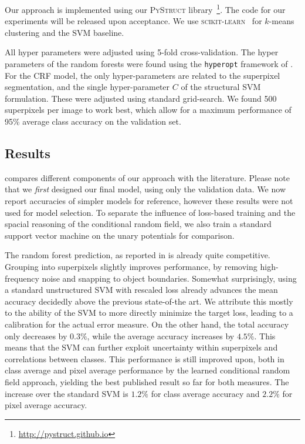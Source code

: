 \documentclass[a4paper, 10pt, conference]{ieeeconf}      %
\begin{document}
Our approach is implemented using our \textsc{PyStruct}
library~\footnote{\url{http://pystruct.github.io}}.  The code for our
experiments will be released upon acceptance. We use \textsc{scikit-learn}~\citep{pedregosa2011scikit}
for $k$-means clustering and the SVM baseline.

All hyper parameters were adjusted using 5-fold cross-validation. The
hyper parameters of the random forests were found using the \texttt{hyperopt}
framework of \cite{bergstra2011algorithms}. For the CRF model, the only
hyper-parameters are related to the superpixel segmentation, and the single
hyper-parameter $C$ of the structural SVM formulation. These were adjusted
using standard grid-search.
We found 500 superpixels per image to work best, which allow for a maximum
performance of 95\% average class accuracy on the validation set.

\subsection{Results}
 compares different components of our approach with the literature.
Please note that we \emph{first} designed our final model, using only the
validation data. We now report accuracies of simpler models for reference,
however these results were not used for model selection. To separate
the influence of loss-based training and the spacial reasoning of the conditional random field,
we also train a standard support vector machine on the unary potentials for comparison.

The random forest prediction, as reported in \citet{stueckler2013} is already quite competitive.
Grouping into superpixels slightly improves performance, by removing
high-frequency noise and snapping to object boundaries. Somewhat surprisingly,
using a standard unstructured SVM with rescaled loss already advances the mean
accuracy decidedly above the previous state-of-the art. We
attribute this mostly to the ability of the SVM to more directly minimize the
target loss, leading to a calibration for the actual error measure. On the
other hand, the total accuracy only decreases by $0.3\%$, while the average
accuracy increases by $4.5\%$. This means that the SVM can further exploit
uncertainty within superpixels and correlations between classes.
This performance is still improved upon, both in class average and pixel average performance
by the learned conditional random field approach, yielding the best published result
so far for both measures. The increase over the standard SVM is $1.2\%$ for class average accuracy
and $2.2\%$ for pixel average accuracy.
\end{document}
